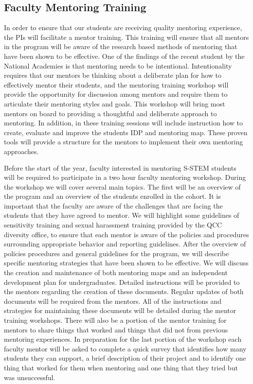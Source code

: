\documentclass[12pt]{article}
\begin{document}
\vspace{-5mm}

\subsection{\normalsize{Faculty Mentoring Training}}\label{sect:facultytraining}
\vspace{-2mm}

In order to ensure that our students are receiving quality mentoring experience, the PIs will facilitate a mentor training.  This training will ensure that all mentors in the program will be aware of the research based methods of mentoring that have been shown to be effective.  One of the findings of the recent student by the National Academies is that mentoring needs to be intentional.  Intentionality requires that our mentors be thinking about a deliberate plan for how to effectively mentor their students, and the mentoring training workshop will provide the opportunity for discussion among mentors and require them to articulate their mentoring styles and goals. This workshop will bring most mentors on board to providing a thoughtful and deliberate approach to mentoring.  In addition, in these training sessions will include instruction how to create, evaluate and improve the students IDP and mentoring map. These proven tools will provide a structure for the mentors to implement their own mentoring approaches.  

Before the start of the year, faculty interested in mentoring S-STEM students will be required to participate in a two hour faculty mentoring workshop.  During the workshop we will cover several main topics.  The first will be an overview of the program and an overview of the students enrolled in the cohort.  It is important that the faculty are aware of the challenges that are facing the students that they have agreed to mentor.  We will highlight some guidelines of sensitivity training and sexual harassment training provided by the  QCC diversity office, to ensure that each mentor is aware of the policies and procedures surrounding appropriate behavior and reporting guidelines.  After the overview of policies procedures and general guidelines for the program, we will describe specific mentoring strategies that have been shown to be effective. We will discuss the creation and maintenance of both mentoring maps and an independent development plan for undergraduates.  Detailed instructions will be provided to the mentors regarding the creation of these documents.  Regular updates of both documents will be required from the mentors.  All of the instructions and strategies for maintaining these documents will be detailed during the mentor training workshops.   There will also be a portion of the mentor training for mentors to share things that worked and things that did not from previous mentoring experiences.  In preparation for the last portion of the workshop each faculty mentor will be asked to complete a quick survey that identifies how many students they can support, a brief description of their project and to identify one thing that worked for them when mentoring and one thing that they tried but was unsuccessful. 
\end{document}
